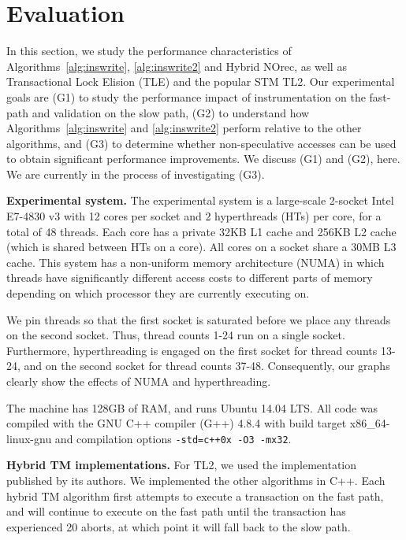 \section{Evaluation}
\label{sec:eval}
%
In this section, we study the performance characteristics of Algorithms~\ref{alg:inswrite}, \ref{alg:inswrite2} and Hybrid NOrec, as well as Transactional Lock Elision (TLE) and the popular STM TL2.
Our experimental goals are (G1) to study the performance impact of instrumentation on the fast-path and validation on the slow path, (G2) to understand how Algorithms~\ref{alg:inswrite} and \ref{alg:inswrite2} perform relative to the other algorithms, and (G3) to determine whether non-speculative accesses can be used to obtain significant performance improvements.
We discuss (G1) and (G2), here.
We are currently in the process of investigating (G3).


\vspace{1mm}\noindent\textbf{Experimental system.}
The experimental system is a large-scale 2-socket Intel E7-4830 v3 with 12 cores per socket and 2 hyperthreads (HTs) per core, for a total of 48 threads.
Each core has a private 32KB L1 cache and 256KB L2 cache (which is shared between HTs on a core).
All cores on a socket share a 30MB L3 cache.
This system has a non-uniform memory architecture (NUMA) in which threads have significantly different access costs to different parts of memory depending on which processor they are currently executing on.

We pin threads so that the first socket is saturated before we place any threads on the second socket.
Thus, thread counts 1-24 run on a single socket.
Furthermore, hyperthreading is engaged on the first socket for thread counts 13-24, and on the second socket for thread counts 37-48.
Consequently, our graphs clearly show the effects of NUMA and hyperthreading.

The machine has 128GB of RAM, and runs Ubuntu 14.04 LTS.
All code was compiled with the GNU C++ compiler (G++) 4.8.4 with build target x86\_64-linux-gnu and compilation options \texttt{-std=c++0x -O3 -mx32}.

\vspace{1mm}\noindent\textbf{Hybrid TM implementations.}
For TL2, we used the implementation published by its authors.
We implemented the other algorithms in C++.
Each hybrid TM algorithm first attempts to execute a transaction on the fast path, and will continue to execute on the fast path until the transaction has experienced 20 aborts, at which point it will fall back to the slow path.

